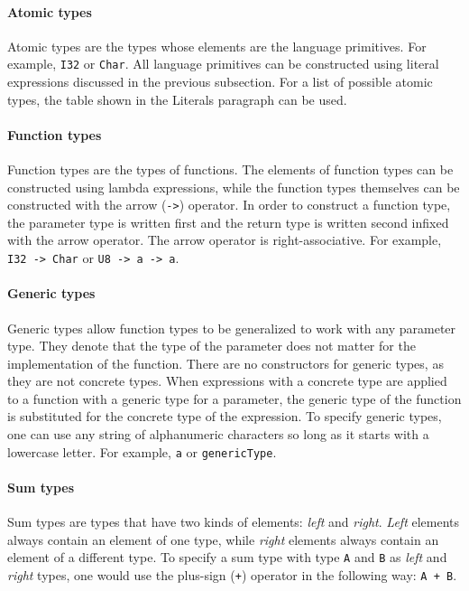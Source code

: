 \documentclass[12pt]{article}
\begin{document}
\paragraph{Atomic types} Atomic types are the types whose elements are the
language primitives. For example, \verb$I32$ or \verb$Char$. All language
primitives can be constructed using literal expressions discussed in the
previous subsection. For a list of possible atomic types, the table shown in the
Literals paragraph can be used.

\paragraph{Function types} Function types are the types of functions. The
elements of function types can be constructed using lambda expressions, while
the function types themselves can be constructed with the arrow (\verb$->$)
operator. In order to construct a function type, the parameter type is written
first and the return type is written second infixed with the arrow operator. The
arrow operator is right-associative. For example, \verb$I32 -> Char$ or 
\verb$U8 -> a -> a$.

\paragraph{Generic types} Generic types allow function types to be generalized
to work with any parameter type. They denote that the type of the parameter does
not matter for the implementation of the function. There are no constructors for
generic types, as they are not concrete types. When expressions with a concrete
type are applied to a function with a generic type for a parameter, the generic
type of the function is substituted for the concrete type of the expression. To
specify generic types, one can use any string of alphanumeric characters so long
as it starts with a lowercase letter. For example, \verb$a$ or
\verb$genericType$.

\paragraph{Sum types} Sum types are types that have two kinds of elements:
\emph{left} and \emph{right}. \emph{Left} elements always contain an element of
one type, while \emph{right} elements always contain an element of a different
type. To specify a sum type with type \verb$A$ and \verb$B$ as \emph{left} and
\emph{right} types, one would use the plus-sign (\verb$+$) operator in the
following way: \verb$A + B$.
\end{document}
